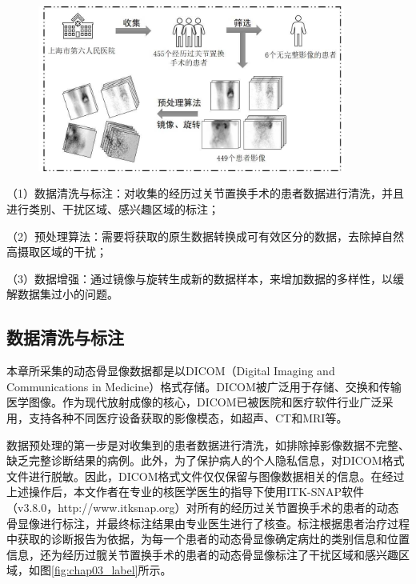 \begin{figure}[htbp]
  \centering
  \includegraphics[width=0.9\textwidth]{figures/chap03_preprocess.jpg}
  \label{fig:chap03_preprocess}
\end{figure}

（1）数据清洗与标注：对收集的经历过关节置换手术的患者数据进行清洗，并且进行类别、干扰区域、感兴趣区域的标注；

（2）预处理算法：需要将获取的原生数据转换成可有效区分的数据，去除掉自然高摄取区域的干扰；

（3）数据增强：通过镜像与旋转生成新的数据样本，来增加数据的多样性，以缓解数据集过小的问题。


\subsection{数据清洗与标注}

本章所采集的动态骨显像数据都是以DICOM（Digital Imaging and Communications in Medicine）格式存储。DICOM被广泛用于存储、交换和传输医学图像。作为现代放射成像的核心，DICOM已被医院和医疗软件行业广泛采用，支持各种不同医疗设备获取的影像模态，如超声、CT和MRI等\cite{mildenberger2002introduction}。

数据预处理的第一步是对收集到的患者数据进行清洗，如排除掉影像数据不完整、缺乏完整诊断结果的病例。此外，为了保护病人的个人隐私信息，对DICOM格式文件进行脱敏。因此，DICOM格式文件仅仅保留与图像数据相关的信息。在经过上述操作后，本文作者在专业的核医学医生的指导下使用ITK-SNAP软件（v3.8.0，http://www.itksnap.org）对所有的经历过关节置换手术的患者的动态骨显像进行标注，并最终标注结果由专业医生进行了核查。标注根据患者治疗过程中获取的诊断报告为依据，为每一个患者的动态骨显像确定病灶的类别信息和位置信息，还为经历过髋关节置换手术的患者的动态骨显像标注了干扰区域和感兴趣区域，如图\ref{fig:chap03_label}所示。

